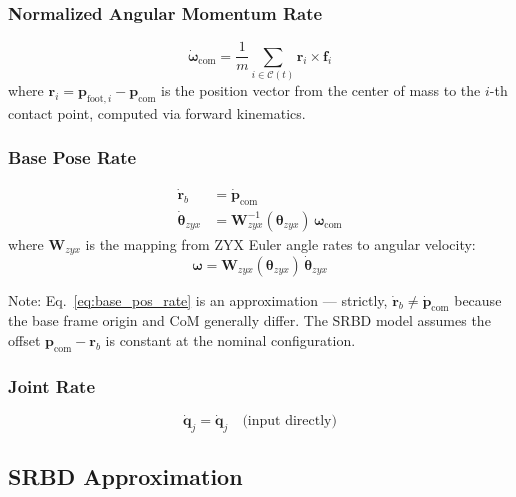 \documentclass[11pt,a4paper]{article}
\begin{document}
\subsubsection{Normalized Angular Momentum Rate}

\begin{equation}
	\boxed{
		\dot{\bm{\omega}}_{\text{com}} = \frac{1}{m}\sum_{i \in \mathcal{C}(t)} \bm{r}_i \times \bm{f}_i
	}
\end{equation}
where $\bm{r}_i = \bm{p}_{\text{foot},i} - \bm{p}_{\text{com}}$ is the position vector from the center of mass to the $i$-th contact point, computed via forward kinematics.

\subsubsection{Base Pose Rate}

\begin{align}
	\dot{\bm{r}}_b          & = \dot{\bm{p}}_{\text{com}} \label{eq:base_pos_rate}                                       \\
	\dot{\bm{\theta}}_{zyx} & = \bm{W}_{zyx}^{-1}(\bm{\theta}_{zyx})\, \bm{\omega}_{\text{com}} \label{eq:base_ori_rate}
\end{align}
where $\bm{W}_{zyx}$ is the mapping from ZYX Euler angle rates to angular velocity:
\begin{equation}
	\bm{\omega} = \bm{W}_{zyx}(\bm{\theta}_{zyx})\, \dot{\bm{\theta}}_{zyx}
\end{equation}

Note: Eq.~\eqref{eq:base_pos_rate} is an approximation --- strictly, $\dot{\bm{r}}_b \neq \dot{\bm{p}}_{\text{com}}$ because the base frame origin and CoM generally differ. The SRBD model assumes the offset $\bm{p}_{\text{com}} - \bm{r}_b$ is constant at the nominal configuration.

\subsubsection{Joint Rate}

\begin{equation}
	\dot{\bm{q}}_j = \dot{\bm{q}}_j \quad \text{(input directly)}
\end{equation}

\subsection{SRBD Approximation}
\end{document}
